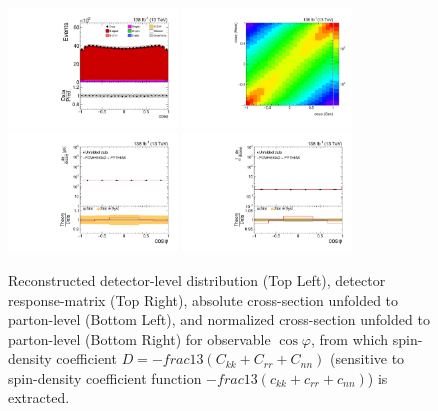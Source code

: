 \clearpage
\begin{figure}[htb]
\begin{center}
 \includegraphics[width=0.40\textwidth]{fig_fullRun2UL/controlplots/combined/Hyp_LLBarcHel.pdf}
 \includegraphics[width=0.40\textwidth]{fig_fullRun2UL/unfolding/combined/ResponseMatrix_ll_cHel.pdf} \\
 \includegraphics[width=0.40\textwidth]{fig_fullRun2UL/unfolding/combined/UnfoldedResults_ll_cHel.pdf}
 \includegraphics[width=0.40\textwidth]{fig_fullRun2UL/unfolding/combined/UnfoldedResultsNorm_ll_cHel.pdf} \\
\label{fig:ll_cHel}
\caption{Reconstructed detector-level distribution (Top Left), detector response-matrix (Top Right), absolute cross-section unfolded to parton-level (Bottom Left), and normalized cross-section unfolded to parton-level (Bottom Right) for  observable $\cos\varphi$, from which spin-density coefficient $D = -frac{1}{3}(C_{kk} + C_{rr} + C_{nn})$ (sensitive to spin-density coefficient function $-frac{1}{3}(c_{kk} + c_{rr} + c_{nn})$) is extracted.}
\end{center}
\end{figure}
